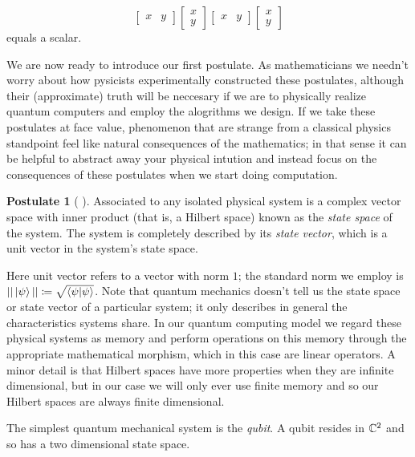 \documentclass[12pt,twoside]{reedthesis}
\theoremstyle{plain}   %
\theoremstyle{definition}
\newtheorem{post}{Postulate}[section]
\theoremstyle{remark}
\numberwithin{equation}{section}
\begin{document}
   \[
     \begin{bmatrix}
       x & y
     \end{bmatrix}
     \begin{bmatrix}
       x \\ y
     \end{bmatrix}
     \begin{bmatrix}
       x & y
     \end{bmatrix}
     \begin{bmatrix}
       x \\ y
     \end{bmatrix}
   \]
   equals a scalar.
   \par
   We are now ready to introduce our first postulate. As mathematicians we needn't worry about how pysicists experimentally constructed these postulates, although their
   (approximate) truth will be neccesary if we are to physically realize quantum computers and employ the alogrithms we design.
   If we take these postulates at face value, phenomenon that are strange from a classical physics standpoint feel like natural consequences of the mathematics;
   in that sense it can be helpful to abstract away your physical intution and instead focus on the consequences of these postulates when we start doing computation.
   \begin{post}[ {\cite[2.2.1]{nielsen2010}} ]
     Associated to any isolated physical system is a complex vector space
     with inner product (that is, a Hilbert space) known as the \emph{state space} of the
     system. The system is completely described by its \emph{state vector}, which is a unit
     vector in the system's state space.
   \end{post}
   Here unit vector refers to a vector with norm $1$; the standard norm we employ is $|| \ket{\psi} || \coloneq \sqrt{\braket{\psi| \psi}}$.
   Note that quantum mechanics doesn't tell us the state space or state vector of a particular system; it only describes in general the characteristics systems share.
   In our quantum computing model we regard these physical systems as memory and perform operations on this memory through the appropriate mathematical morphism, which in this case are linear operators.
   A minor detail is that Hilbert spaces have more properties when they are infinite dimensional, but in our case we will only ever use finite memory and so our Hilbert spaces are always finite dimensional. \par
   The simplest quantum mechanical system is the \emph{qubit}. A qubit resides in $\mathbb{C}^2$ and so has a two dimensional state space.
\end{document}
